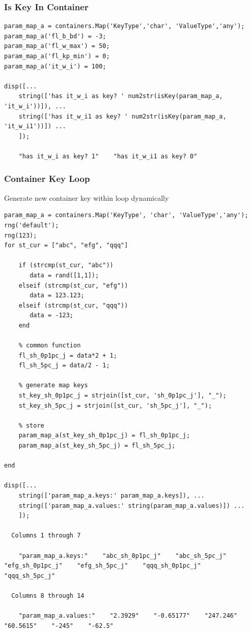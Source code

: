 \documentclass[
]{book}
\begin{document}
\hypertarget{is-key-in-container}{%
\subsubsection{Is Key In Container}\label{is-key-in-container}}

\begin{verbatim}
param_map_a = containers.Map('KeyType','char', 'ValueType','any');
param_map_a('fl_b_bd') = -3;
param_map_a('fl_w_max') = 50;
param_map_a('fl_kp_min') = 0;
param_map_a('it_w_i') = 100;

disp([...
    string(['has it_w_i as key? ' num2str(isKey(param_map_a, 'it_w_i'))]), ...
    string(['has it_w_i1 as key? ' num2str(isKey(param_map_a, 'it_w_i1'))]) ...
    ]);

    "has it_w_i as key? 1"    "has it_w_i1 as key? 0"
\end{verbatim}

\hypertarget{container-key-loop}{%
\subsubsection{Container Key Loop}\label{container-key-loop}}

Generate new container key within loop dynamically

\begin{verbatim}
param_map_a = containers.Map('KeyType', 'char', 'ValueType','any');
rng('default');
rng(123);
for st_cur = ["abc", "efg", "qqq"]

    if (strcmp(st_cur, "abc"))
       data = rand([1,1]);
    elseif (strcmp(st_cur, "efg"))
       data = 123.123;
    elseif (strcmp(st_cur, "qqq"))
       data = -123;
    end

    % common function
    fl_sh_0p1pc_j = data*2 + 1;
    fl_sh_5pc_j = data/2 - 1;

    % generate map keys
    st_key_sh_0p1pc_j = strjoin([st_cur, 'sh_0p1pc_j'], "_");
    st_key_sh_5pc_j = strjoin([st_cur, 'sh_5pc_j'], "_");

    % store
    param_map_a(st_key_sh_0p1pc_j) = fl_sh_0p1pc_j;
    param_map_a(st_key_sh_5pc_j) = fl_sh_5pc_j;

end

disp([...
    string(['param_map_a.keys:' param_map_a.keys]), ...
    string(['param_map_a.values:' string(param_map_a.values)]) ...
    ]);

  Columns 1 through 7

    "param_map_a.keys:"    "abc_sh_0p1pc_j"    "abc_sh_5pc_j"    "efg_sh_0p1pc_j"    "efg_sh_5pc_j"    "qqq_sh_0p1pc_j"    "qqq_sh_5pc_j"

  Columns 8 through 14

    "param_map_a.values:"    "2.3929"    "-0.65177"    "247.246"    "60.5615"    "-245"    "-62.5"
\end{verbatim}
\end{document}
